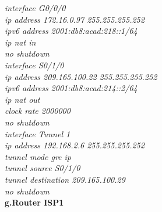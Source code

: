 \documentclass[12pt,a4paper]{report}
\begin{document}
\hspace*{2cm}\textit{interface G0/0/0\\
\hspace*{2cm}ip address 172.16.0.97 255.255.255.252\\
\hspace*{2cm}ipv6 address 2001:db8:acad:218::1/64\\
\hspace*{2cm}ip nat in\\
\hspace*{2cm}no shutdown\\
\hspace*{2cm}interface S0/1/0\\
\hspace*{2cm}ip address 209.165.100.22 255.255.255.252\\
\hspace*{2cm}ipv6 address 2001:db8:acad:214::2/64\\
\hspace*{2cm}ip nat out\\
\hspace*{2cm}clock rate 2000000\\
\hspace*{2cm}no shutdown\\
\hspace*{2cm}interface Tunnel 1\\
\hspace*{2cm}ip address 192.168.2.6 255.255.255.252\\
\hspace*{2cm}tunnel mode gre ip\\
\hspace*{2cm}tunnel source S0/1/0\\
\hspace*{2cm}tunnel destination 209.165.100.29\\
\hspace*{2cm}no shutdown\\}
\hspace*{1cm}\textbf{g.Router ISP1} \\
\end{document}
